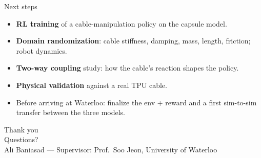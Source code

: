 \documentclass[aspectratio=169]{beamer}
\begin{document}
\begin{frame}{Next steps}
  \begin{itemize}
    \item \textbf{RL training} of a cable-manipulation policy on the capsule model.
    \item \textbf{Domain randomization}: cable stiffness, damping, mass, length,
          friction; robot dynamics.
    \item \textbf{Two-way coupling} study: how the cable's reaction shapes the policy.
    \item \textbf{Physical validation} against a real TPU cable.
    \item Before arriving at Waterloo: finalize the env + reward and a first
          sim-to-sim transfer between the three models.
  \end{itemize}
\end{frame}

\begin{frame}[plain]
  \centering\vfill
  {\Large Thank you}\\[1em]
  {\large Questions?}\\[2em]
  {\footnotesize Ali Baniasad --- Supervisor: Prof.\ Soo Jeon, University of Waterloo}
  \vfill
\end{frame}
\end{document}
